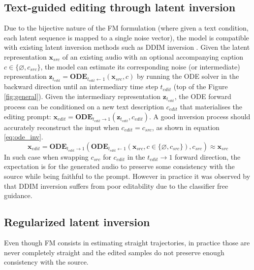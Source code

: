 \subsection{Text-guided editing through latent inversion}
Due to the bijective nature of the FM formulation (where given a text condition, each latent sequence is mapped to a single noise vector), the model is compatible with existing latent inversion methods such as DDIM inversion \citep{song2020denoising}.
Given the latent representation $\mathbf{x}_{src}$ of an existing audio with an optional accompanying caption $c\in\{\varnothing,c_{src}\}$, the model can estimate its corresponding noise (or intermediate) representation $\mathbf{z}_{t_{edit}}=\textbf{ODE}_{t_{edit}\xleftarrow{}1}(\mathbf{x}_{src},c)$ by running the ODE solver in the backward direction until an intermediary time step $t_{edit}$ (top of the Figure \ref{fig:general}).
Given the intermediary representation $\mathbf{z}_{t_{edit}}$, the ODE forward process can be conditioned on a new text description $c_{edit}$ that materialises the editing prompt: $\mathbf{x}_{edit}=\textbf{ODE}_{t_{edit}\xrightarrow{}1}(\mathbf{z}_{t_{edit}},c_{edit})$.
A good inversion process should accurately reconstruct the input when $c_{edit}=c_{src}$, as shown in equation \ref{eq:ode_inv}.
\[
\mathbf{x}_{edit}=\textbf{ODE}_{t_{edit}\xrightarrow{}1}(\textbf{ODE}_{t_{edit}\xleftarrow{}1}(\mathbf{x}_{src},c\in\{\varnothing,c_{src}\}),c_{src}) \approx \mathbf{x}_{src}
\label{eq:ode_inv}
\]
In such case when swapping $c_{src}$ for $c_{edit}$ in the $t_{edit}\xrightarrow{}1$ forward direction, the expectation is for the generated audio to preserve some consistency with the source while being faithful to the prompt.
However in practice it was observed by \citet{mokady2023null} that DDIM inversion suffers from poor editability due to the classifier free guidance.


\subsection{Regularized latent inversion}

Even though FM consists in estimating straight trajectories, in practice those are never completely straight and the edited samples do not preserve enough consistency with the source.

